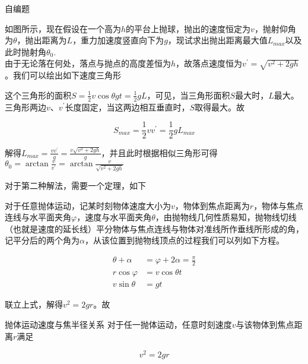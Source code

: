 \begin{ep}{自编题}{}



如图所示，现在假设在一个高为$h$的平台上抛球，抛出的速度恒定为$v$，抛射仰角为$\theta$，抛出距离为$L$，重力加速度竖直向下为$g$，现试求出抛出距离最大值$L_{max}$以及此时抛射角$\theta_0$.
~\\

由于无论落在何处，落点与抛点的高度差恒为$h$，故落点速度恒为$v^{\prime} = \sqrt{v^2 + 2gh}$。我们可以绘出如下速度三角形



这个三角形的面积$S=\frac{1}{2} v \cos \theta gt = \frac{1}{2} g L$，可见，当三角形面积$S$最大时，$L$最大。三角形两边$v$、$v^{\prime}$长度固定，当这两边相互垂直时，$S$取得最大。故

$$S_{max} = \frac{1}{2} v v^{\prime} = \frac{1}{2} g L_{max}$$

解得$L_{max} = \frac{v v^{\prime}}{g} = \frac{v\sqrt{v^2 + 2gh}}{g}$，并且此时根据相似三角形可得$\theta_0 = \arctan{\frac{v}{v^{\prime}}} = \arctan{\frac{v}{\sqrt{v^2 + 2gh}}}$

\end{ep}

对于第二种解法，需要一个定理，如下



对于任意抛体运动，记某时刻物体速度大小为$v$，物体到焦点距离为$r$，物体与焦点连线与水平面夹角$\varphi$，速度与水平面夹角$\theta$，由抛物线几何性质易知，抛物线切线（也就是速度的延长线）平分物体与焦点连线与物体对准线所作垂线所形成的角，记平分后的两个角为$\alpha$，从该位置到抛物线顶点的过程我们可以列如下方程。

\begin{subequations}
\begin{align*}
\theta + \alpha &= \varphi + 2 \alpha = \frac{\pi}{2} \\
r \cos \varphi &= v \cos \theta t \\
v \sin \theta &= gt 
\end{align*}
\end{subequations}

联立上式，解得$v^2 = 2gr$。故

\begin{theo}[label=d_ptydjbj]{抛体运动速度与焦半径关系}{}
对于任一抛体运动，任意时刻速度$v$与该物体到焦点距离$r$满足

$$v^2 = 2gr$$

\end{theo}

